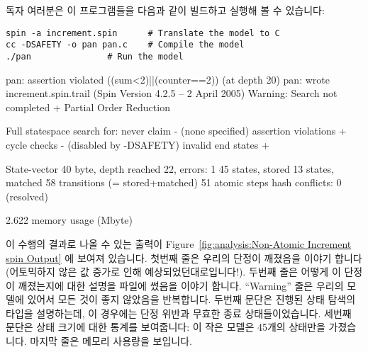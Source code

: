 독자 여러분은 이 프로그램들을 다음과 같이 빌드하고 실행해 볼 수 있습니다:
\iffalse

The atomic block on lines~29-39 also contains a similar do-od
loop that sums up the progress counters.
The {\tt assert()} statement on line~38 verifies that if all processes
have been completed, then all counts have been correctly recorded.

You can build and run this program as follows:
\fi

\vspace{5pt}
\begin{minipage}[t]{\columnwidth}
\scriptsize
\begin{verbatim}
spin -a increment.spin		# Translate the model to C
cc -DSAFETY -o pan pan.c	# Compile the model
./pan				# Run the model
\end{verbatim}
\end{minipage}
\vspace{5pt}

{ \scriptsize
\begin{verbbox}
pan: assertion violated ((sum<2)||(counter==2)) (at depth 20)
pan: wrote increment.spin.trail
(Spin Version 4.2.5 -- 2 April 2005)
Warning: Search not completed
        + Partial Order Reduction

Full statespace search for:
        never claim             - (none specified)
        assertion violations    +
        cycle checks            - (disabled by -DSAFETY)
        invalid end states      +

State-vector 40 byte, depth reached 22, errors: 1
      45 states, stored
      13 states, matched
      58 transitions (= stored+matched)
      51 atomic steps
hash conflicts: 0 (resolved)

2.622  memory usage (Mbyte)
\end{verbbox}
}
\begin{figure*}[tbp]
\centering
\theverbbox
\caption{Non-Atomic Increment spin Output}
\label{fig:analysis:Non-Atomic Increment spin Output}
\end{figure*}

이 수행의 결과로 나올 수 있는 출력이
Figure~\ref{fig:analysis:Non-Atomic Increment spin Output}
에 보여져 있습니다.
첫번째 줄은 우리의 단정이 깨졌음을 이야기 합니다 (어토믹하지 않은 값 증가로
인해 예상되었던대로입니다!).
두번째 줄은 어떻게 이 단정이 깨졌는지에 대한 설명을  파일에 썼음을
이야기 합니다.
``Warning''  줄은 우리의 모델에 있어서 모든 것이 좋지 않았음을 반복합니다.
두번째 문단은 진행된 상태 탐색의 타입을 설명하는데, 이 경우에는 단정 위반과
무효한 종료 상태들이었습니다.
세번째 문단은 상태 크기에 대한 통계를 보여줍니다: 이 작은 모델은 45개의
상태만을 가졌습니다.
마지막 줄은 메모리 사용량을 보입니다.

